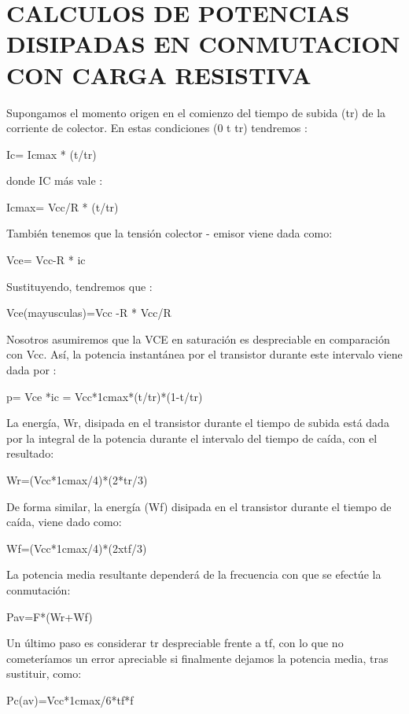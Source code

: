 \documentclass[11pt,a4paper]{article}
\begin{document}
\section{CALCULOS DE POTENCIAS DISIPADAS EN CONMUTACION CON CARGA RESISTIVA}
Supongamos el momento origen en el comienzo del tiempo de subida (tr) de la corriente de colector. En estas condiciones (0 t tr) tendremos :
\begin{center}
Ic= Icmax * (t/tr)
\end{center}
donde IC más vale :
\begin{center}
Icmax= Vcc/R * (t/tr)
\end{center}
También tenemos que la tensión colector - emisor viene dada como:
\begin{center}
Vce= Vcc-R * ic
\end{center}
Sustituyendo, tendremos que :
\begin{center}
Vce(mayusculas)=Vcc -R * Vcc/R
\end{center}
Nosotros asumiremos que la VCE en saturación es despreciable en comparación con Vcc.
Así, la potencia instantánea por el transistor durante este intervalo viene dada por :
\begin{center}
p= Vce *ic = Vcc*1cmax*(t/tr)*(1-t/tr)
\end{center}
La energía, Wr, disipada en el transistor durante el tiempo de subida está dada por la integral de la potencia durante el intervalo del tiempo de caída, con el resultado:
\begin{center}
Wr=(Vcc*1cmax/4)*(2*tr/3)
\end{center}
De forma similar, la energía (Wf) disipada en el transistor durante el tiempo de caída, viene dado como:
\begin{center}
Wf=(Vcc*1cmax/4)*(2xtf/3)
\end{center}
La potencia media resultante dependerá de la frecuencia con que se efectúe la conmutación:
\begin{center}
Pav=F*(Wr+Wf)
\end{center}
Un último paso es considerar tr despreciable frente a tf, con lo que no cometeríamos un error apreciable si finalmente dejamos la potencia media, tras sustituir, como:
\begin{center}
Pc(av)=Vcc*1cmax/6*tf*f
\end{center}
\end{document}
